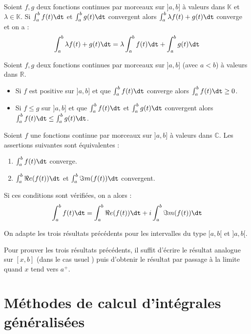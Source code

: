 \documentclass[a4paper,10pt]{report}
\begin{document}
\begin{prop} 
Soient $f,g$ deux fonctions continues par morceaux sur $]a,b]$ à valeurs dans $\mathbb{K}$ et $\lambda \in \mathbb{K}$. Si $\int_{a}^b f(t) \dt$ et $\int_{a}^b g(t) \dt$ convergent alors $\int_{a}^b \lambda f(t) + g(t) \dt$ converge et on a :
$$ \int_{a}^b \lambda f(t) + g(t) \dt = \lambda \int_{a}^b f(t) \dt + \int_{a}^b g(t) \dt$$
\end{prop}

\begin{prop}
Soient $f,g$ deux fonctions continues par morceaux sur $]a,b]$ (avec $a<b$) à valeurs dans $\mathbb{R}$.

\begin{itemize}
\item Si $f$ est positive sur $]a,b]$ et que $\int_{a}^b f(t) \dt$ converge alors $\int_{a}^b f(t) \dt \geq 0$.
\item Si $f \leq g$ sur $]a,b]$ et que $\int_{a}^b f(t) \dt$ et $\int_{a}^b g(t) \dt$ convergent alors $\int_{a}^b f(t) \dt \leq \int_{a}^b g(t) \dt$.
\end{itemize}
\end{prop}

\begin{prop} Soient $f$ une fonctions continue par morceaux sur $]a,b]$ à valeurs dans $\mathbb{C}$. Les assertions suivantes sont équivalentes :

\begin{enumerate}
\item $\int_{a}^b f(t) \dt$ converge.
\item $\int_{a}^b \Re e(f(t)) \dt$ et $\int_{a}^b \Im m(f(t)) \dt$ convergent.
\end{enumerate}
Si ces conditions sont vérifiées, on a alors :
$$ \int_{a}^b f(t) \dt = \int_{a}^b \Re e(f(t)) \dt + i \int_{a}^b \Im m(f(t)) \dt$$
\end{prop}


\begin{rems}
\item On adapte les trois résultats précédents pour les intervalles du type $[a,b[$ et $]a,b[$.
\item Pour prouver les trois résultats précédents, il suffit d'écrire le résultat analogue sur $[x,b]$ (dans le cas \og usuel \fg) puis d'obtenir le résultat par passage à la limite quand $x$ tend vers $a^{+}$.
\end{rems}

\section{Méthodes de calcul d'intégrales généralisées}
\end{document}
